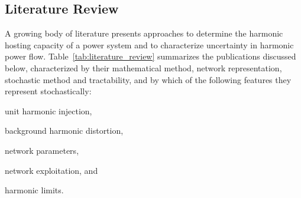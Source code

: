 \subsection{Literature Review}
\label{sec:literature_review}

A growing body of literature presents approaches to determine the harmonic hosting capacity of a power system and to characterize uncertainty in harmonic power flow. Table~\ref{tab:literature_review} summarizes the publications discussed below, characterized by their mathematical method, network representation, stochastic method and tractability, and by which of the following features they represent stochastically:
\begin{enumerate*}
    \item [(a)] unit harmonic injection,
    \item [(b)] background harmonic distortion,
    \item [(c)] network parameters,
    \item [(d)] network exploitation, and
    \item [(e)] harmonic limits.
\end{enumerate*}

